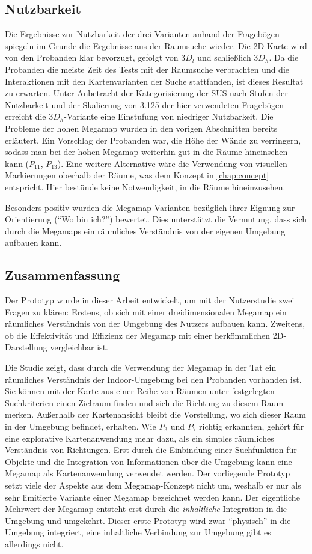 \subsection{Nutzbarkeit}
Die Ergebnisse zur Nutzbarkeit der drei Varianten anhand der Fragebögen spiegeln im Grunde die Ergebnisse aus der Raumsuche wieder.
Die 2D-Karte wird von den Probanden klar bevorzugt, gefolgt von $3D_l$ und schließlich $3D_h$.
Da die Probanden die meiste Zeit des Tests mit der Raumsuche verbrachten und die Interaktionen mit den Kartenvarianten der Suche stattfanden, ist dieses Resultat zu erwarten.
Unter Anbetracht der Kategorisierung der SUS nach Stufen der Nutzbarkeit \autocite{Brooke2013} und der Skalierung von \num{3,125} der hier verwendeten Fragebögen erreicht die $3D_h$-Variante eine Einstufung von niedriger Nutzbarkeit.
Die Probleme der hohen Megamap wurden in den vorigen Abschnitten bereits erläutert.
Ein Vorschlag der Probanden war, die Höhe der Wände zu verringern, sodass man bei der hohen Megamap weiterhin gut in die Räume hineinsehen kann ($P_{11}$, $P_{13}$).
Eine weitere Alternative wäre die Verwendung von visuellen Markierungen oberhalb der Räume, was dem Konzept in \autoref{chap:concept} entspricht.
Hier bestünde keine Notwendigkeit, in die Räume hineinzusehen.

Besonders positiv wurden die Megamap-Varianten bezüglich ihrer Eignung zur Orientierung (\enquote{Wo bin ich?}) bewertet.
Dies unterstützt die Vermutung, dass sich durch die Megamaps ein räumliches Verständnis von der eigenen Umgebung aufbauen kann.

\subsection{Zusammenfassung}
Der Prototyp wurde in dieser Arbeit entwickelt, um mit der Nutzerstudie zwei Fragen zu klären:
Erstens, ob sich mit einer dreidimensionalen Megamap ein räumliches Verständnis von der Umgebung des Nutzers aufbauen kann.
Zweitens, ob die Effektivität und Effizienz der Megamap mit einer herkömmlichen 2D-Darstellung vergleichbar ist.

Die Studie zeigt, dass durch die Verwendung der Megamap in der Tat ein räumliches Verständnis der Indoor-Umgebung bei den Probanden vorhanden ist.
Sie können mit der Karte aus einer Reihe von Räumen unter festgelegten Suchkriterien einen Zielraum finden und sich die Richtung zu diesem Raum merken.
Außerhalb der Kartenansicht bleibt die Vorstellung, wo sich dieser Raum in der Umgebung befindet, erhalten.
Wie $P_3$ und $P_7$ richtig erkannten, gehört für eine explorative Kartenanwendung mehr dazu, als ein simples räumliches Verständnis von Richtungen.
Erst durch die Einbindung einer Suchfunktion für Objekte und die Integration von Informationen über die Umgebung kann eine Megamap als Kartenanwendung verwendet werden.
Der vorliegende Prototyp setzt viele der Aspekte aus dem Megamap-Konzept nicht um, weshalb er nur als sehr limitierte Variante einer Megamap bezeichnet werden kann.
Der eigentliche Mehrwert der Megamap entsteht erst durch die \emph{inhaltliche} Integration in die Umgebung und umgekehrt.
Dieser erste Prototyp wird zwar \enquote{physisch} in die Umgebung integriert, eine inhaltliche Verbindung zur Umgebung gibt es allerdings nicht.

